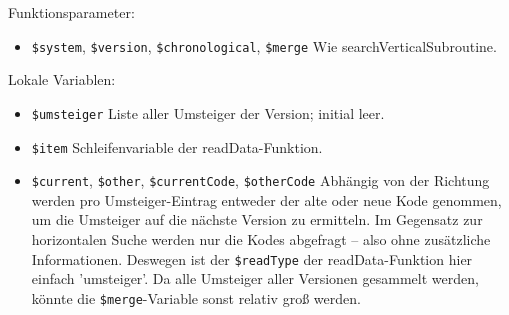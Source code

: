 
Funktionsparameter:

\begin{itemize}
\item \texttt{\$system}, \texttt{\$version}, \texttt{\$chronological}, \texttt{\$merge} \newline Wie searchVerticalSubroutine. 
\end{itemize}

Lokale Variablen:

\begin{itemize}
\item \texttt{\$umsteiger} \newline Liste aller Umsteiger der Version; initial leer.
\item \texttt{\$item} \newline Schleifenvariable der readData-Funktion.
\item \texttt{\$current}, \texttt{\$other}, \texttt{\$currentCode}, \texttt{\$otherCode} \newline Abhängig von der Richtung werden pro Umsteiger-Eintrag entweder der alte oder neue Kode genommen, um die Umsteiger auf die nächste Version zu ermitteln. Im Gegensatz zur horizontalen Suche werden nur die Kodes abgefragt -- also ohne zusätzliche Informationen. Deswegen ist der \texttt{\$readType} der readData-Funktion hier einfach 'umsteiger'. Da alle Umsteiger aller Versionen gesammelt werden, könnte die \texttt{\$merge}-Variable sonst relativ groß werden. 
\end{itemize}


